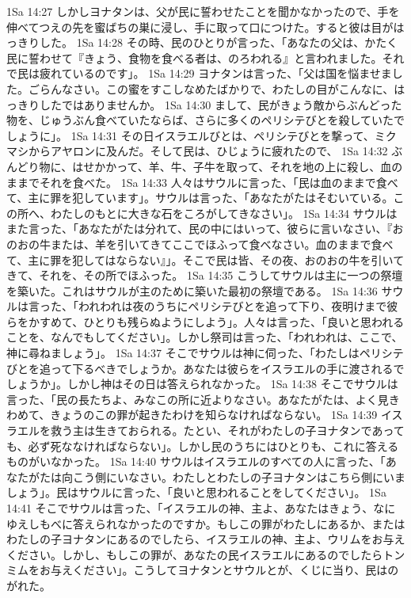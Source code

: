 1Sa 14:27  しかしヨナタンは、父が民に誓わせたことを聞かなかったので、手を伸べてつえの先を蜜ばちの巣に浸し、手に取って口につけた。すると彼は目がはっきりした。
1Sa 14:28  その時、民のひとりが言った、「あなたの父は、かたく民に誓わせて『きょう、食物を食べる者は、のろわれる』と言われました。それで民は疲れているのです」。
1Sa 14:29  ヨナタンは言った、「父は国を悩ませました。ごらんなさい。この蜜をすこしなめたばかりで、わたしの目がこんなに、はっきりしたではありませんか。
1Sa 14:30  まして、民がきょう敵からぶんどった物を、じゅうぶん食べていたならば、さらに多くのペリシテびとを殺していたでしょうに」。
1Sa 14:31  その日イスラエルびとは、ペリシテびとを撃って、ミクマシからアヤロンに及んだ。そして民は、ひじょうに疲れたので、
1Sa 14:32  ぶんどり物に、はせかかって、羊、牛、子牛を取って、それを地の上に殺し、血のままでそれを食べた。
1Sa 14:33  人々はサウルに言った、「民は血のままで食べて、主に罪を犯しています」。サウルは言った、「あなたがたはそむいている。この所へ、わたしのもとに大きな石をころがしてきなさい」。
1Sa 14:34  サウルはまた言った、「あなたがたは分れて、民の中にはいって、彼らに言いなさい、『おのおの牛または、羊を引いてきてここでほふって食べなさい。血のままで食べて、主に罪を犯してはならない』」。そこで民は皆、その夜、おのおの牛を引いてきて、それを、その所でほふった。
1Sa 14:35  こうしてサウルは主に一つの祭壇を築いた。これはサウルが主のために築いた最初の祭壇である。
1Sa 14:36  サウルは言った、「われわれは夜のうちにペリシテびとを追って下り、夜明けまで彼らをかすめて、ひとりも残らぬようにしよう」。人々は言った、「良いと思われることを、なんでもしてください」。しかし祭司は言った、「われわれは、ここで、神に尋ねましょう」。
1Sa 14:37  そこでサウルは神に伺った、「わたしはペリシテびとを追って下るべきでしょうか。あなたは彼らをイスラエルの手に渡されるでしょうか」。しかし神はその日は答えられなかった。
1Sa 14:38  そこでサウルは言った、「民の長たちよ、みなこの所に近よりなさい。あなたがたは、よく見きわめて、きょうのこの罪が起きたわけを知らなければならない。
1Sa 14:39  イスラエルを救う主は生きておられる。たとい、それがわたしの子ヨナタンであっても、必ず死ななければならない」。しかし民のうちにはひとりも、これに答えるものがいなかった。
1Sa 14:40  サウルはイスラエルのすべての人に言った、「あなたがたは向こう側にいなさい。わたしとわたしの子ヨナタンはこちら側にいましょう」。民はサウルに言った、「良いと思われることをしてください」。
1Sa 14:41  そこでサウルは言った、「イスラエルの神、主よ、あなたはきょう、なにゆえしもべに答えられなかったのですか。もしこの罪がわたしにあるか、またはわたしの子ヨナタンにあるのでしたら、イスラエルの神、主よ、ウリムをお与えください。しかし、もしこの罪が、あなたの民イスラエルにあるのでしたらトンミムをお与えください」。こうしてヨナタンとサウルとが、くじに当り、民はのがれた。
